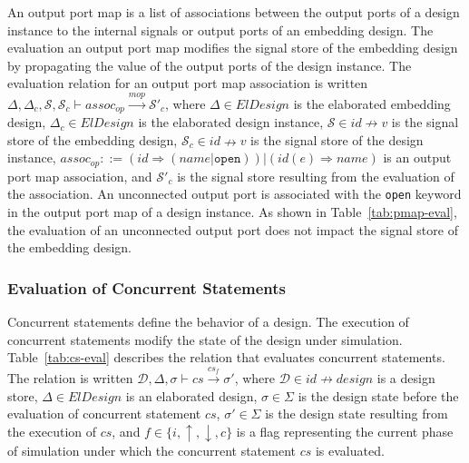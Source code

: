 \documentclass[pdflatex,sn-mathphys]{sn-jnl}%
\theoremstyle{thmstyleone}%
\theoremstyle{thmstyletwo}%
\theoremstyle{thmstylethree}%
\begin{document}
An output port map is a list of associations between the output ports
of a design instance to the internal signals or output ports of an
embedding design.  The evaluation an output port map modifies the
signal store of the embedding design by propagating the value of the
output ports of the design instance. The evaluation relation for an
output port map association is written
$\Delta,\Delta_c,\mathcal{S},\mathcal{S}_c\vdash{}assoc_{op}\xrightarrow{mop}\mathcal{S}'_c$,
where $\Delta\in{}ElDesign$ is the elaborated embedding design,
$\Delta_c\in{}ElDesign$ is the elaborated design instance,
$\mathcal{S}\in{}id\nrightarrow{}v$ is the signal store of the
embedding design, $\mathcal{S}_c\in{}id\nrightarrow{}v$ is the signal
store of the design instance,
$assoc_{op}::=(id\Rightarrow{}(name|\mathtt{open}))\big|(id(e)\Rightarrow{}name)$
is an output port map association, and $\mathcal{S}'_c$ is the signal
store resulting from the evaluation of the association. An unconnected
output port is associated with the \texttt{open} keyword in the output
port map of a design instance.  As shown in Table~\ref{tab:pmap-eval},
the evaluation of an unconnected output port does not impact the
signal store of the embedding design.

\subsubsection{Evaluation of Concurrent Statements}
\label{subsubsec:cs-eval}

Concurrent statements define the behavior of a \hvhdl{} design. The
execution of concurrent statements modify the state of the \hvhdl{}
design under simulation. Table~\ref{tab:cs-eval} describes the
relation that evaluates concurrent statements. The relation is written
$\mathcal{D},\Delta,\sigma\vdash{}cs\xrightarrow{cs_f}\sigma'$, where
$\mathcal{D}\in{}id\nrightarrow{}design$ is a design store,
$\Delta\in{}ElDesign$ is an elaborated design, $\sigma\in\Sigma$ is
the design state before the evaluation of concurrent statement $cs$,
$\sigma'\in\Sigma$ is the design state resulting from the execution of
$cs$, and $f\in\{i,\uparrow,\downarrow,c\}$ is a flag representing the
current phase of simulation under which the concurrent statement $cs$
is evaluated.
\end{document}
